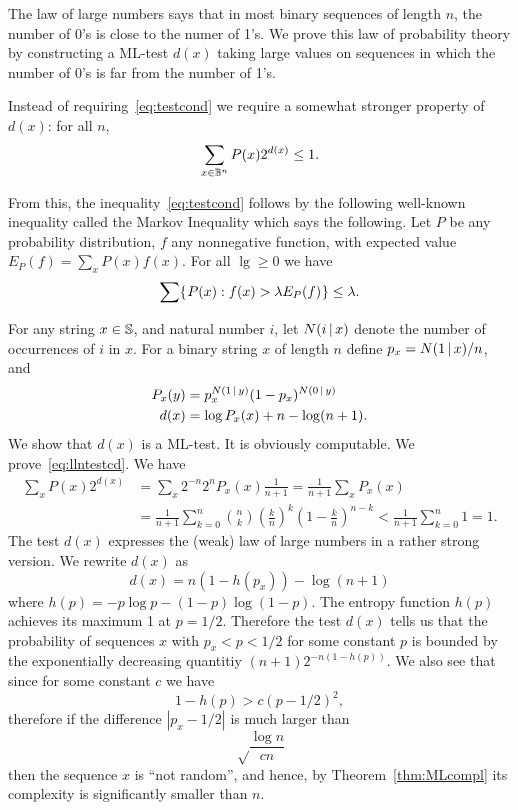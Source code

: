 \begin{example}
The law of large numbers
says that in most binary sequences of length $n$, the number of 0's
is close to the numer of 1's.
We prove this law of probability theory
by constructing a ML-test $d(x)$ taking large values on sequences in
which the number of 0's is far from the number of 1's.

Instead of requiring~\eqref{eq:testcond} we require a somewhat stronger
property of $d(x)$: for all $n$,
 \begin{equation}  \label{eq:llntestcd}
 \sum_{x\in \mathbb{B}^{n}} P(x)2^{d(x)} \le 1.
 \end{equation}

From this, the inequality~\eqref{eq:testcond} follows by the following
well-known inequality called the Markov Inequality which says the
following.
Let $P$ be any probability distribution, $f$ any
nonnegative function, with expected value $E_{P}(f)=\sum_{x}P(x)f(x)$.
For all $\lg\ge 0$ we have
 \begin{equation} \label{eq:Markov}
 \sum\mathopen\{\mskip 1mu P(x): f(x) > \lambda E_{P}(f)\mskip 1mu\mathclose\} \le \lambda.
 \end{equation}

For any string $x\in \mathbb{S}$, and natural number $i$, let $N(i \,\vert\, x)$
denote the number of occurrences of $i$ in $x$.
For a binary string $x$
of length $n$ define $p_{x} = N(1 \,\vert\, x)/n$, and
 \begin{align*}
   P_{x}(y)	&= p_{x}^{N(1 \,\vert\, y)}(1-p_{x})^{N(0 \,\vert\, y)}
 \\ d(x)	&= \log P_{x}(x) + n - \log(n+1).
 \end{align*}
  We show that $d(x)$ is a ML-test.
It is obviously computable.
We prove~\eqref{eq:llntestcd}.
We have
 \begin{align*}
  \sum_{x} P(x) 2^{d(x)} &= \sum_{x} 2^{-n} 2^{n} P_{x}(x)\frac{1}{n+1}
	= \frac{1}{n+1}\sum_{x} P_{x}(x)
  \\ &= \frac{1}{n+1}\sum_{k=0}^{n}\binom{n}{k}(\frac{k}{n})^k
   (1-\frac{k}{n})^{n-k} < \frac{1}{n+1}\sum_{k=0}^{n} 1 = 1.
 \end{align*}
The test $d(x)$ expresses the (weak) law of large numbers in a rather
strong version. We rewrite $d(x)$ as
 \[
 d(x) = n(1 - h(p_{x})) - \log(n+1)
 \]
 where $h(p) = -p\log p - (1-p)\log(1-p)$.
The entropy function
$h(p)$ achieves its maximum 1 at $p=1/2$.
Therefore the test $d(x)$
tells us that the probability of sequences $x$ with $p_{x} < p < 1/2$
for some constant $p$ is bounded by the exponentially decreasing
quantitiy $(n+1)2^{-n(1-h(p))}$.
We also see that since for some
constant $c$ we have
 \[
   1-h(p) > c(p-1/2)^2,
 \]
therefore if the difference $| p_{x} - 1/2 |$ is much larger than
 \[
   \sqrt\frac{\log n}{cn}
 \]
  then the sequence $x$ is ``not random'', and hence, by
Theorem~\ref{thm:MLcompl} its complexity is significantly smaller than $n$.
 \end{example}

